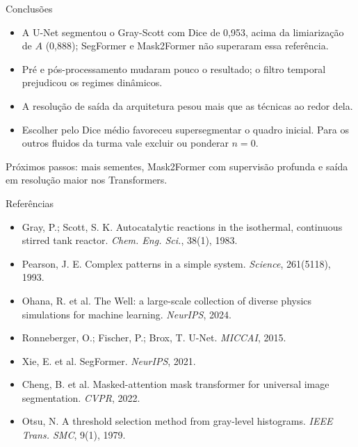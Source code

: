 \documentclass[aspectratio=169,11pt]{beamer}
\newcommand{\leg}[1]{{\small\textcolor{cinza}{#1}}}
\begin{document}
\begin{frame}{Conclusões}

  \begin{itemize}
    \item A U-Net segmentou o Gray-Scott com Dice de 0,953, acima da limiarização
      de $A$ (0,888); SegFormer e Mask2Former não superaram essa referência.
    \item Pré e pós-processamento mudaram pouco o resultado; o filtro temporal
      prejudicou os regimes dinâmicos.
    \item A resolução de saída da arquitetura pesou mais que as técnicas ao redor dela.
    \item Escolher pelo Dice médio favoreceu supersegmentar o quadro inicial.
      Para os outros fluidos da turma vale excluir ou ponderar $n=0$.
  \end{itemize}

  \vspace{.3em}
  \leg{Próximos passos: mais sementes, Mask2Former com supervisão profunda e
  saída em resolução maior nos Transformers.}

\end{frame}

\begin{frame}{Referências}

  \footnotesize
  \begin{itemize}
    \item[] Gray, P.; Scott, S. K. Autocatalytic reactions in the isothermal,
      continuous stirred tank reactor. \textit{Chem. Eng. Sci.}, 38(1), 1983.
    \item[] Pearson, J. E. Complex patterns in a simple system.
      \textit{Science}, 261(5118), 1993.
    \item[] Ohana, R. et al. The Well: a large-scale collection of diverse physics
      simulations for machine learning. \textit{NeurIPS}, 2024.
    \item[] Ronneberger, O.; Fischer, P.; Brox, T. U-Net. \textit{MICCAI}, 2015.
    \item[] Xie, E. et al. SegFormer. \textit{NeurIPS}, 2021.
    \item[] Cheng, B. et al. Masked-attention mask transformer for universal image
      segmentation. \textit{CVPR}, 2022.
    \item[] Otsu, N. A threshold selection method from gray-level histograms.
      \textit{IEEE Trans. SMC}, 9(1), 1979.
  \end{itemize}

\end{frame}
\end{document}
